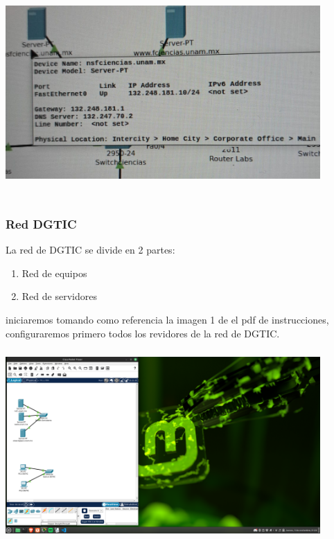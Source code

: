 \documentclass[14pt]{book}
\begin{document}
\includegraphics[width=12cm, height=8cm]{images/dns c5enc5as.jpeg}\\


{\color{red} \subsubsection*{\textbf{Red DGTIC}}}
\vspace{1em}

La red de DGTIC se divide en 2 partes:\\
\begin{enumerate}
  \item Red de equipos
  \item Red de servidores
\end{enumerate}

iniciaremos tomando como referencia la imagen 1 de el pdf de instrucciones, configuraremos primero todos los revidores de la red de DGTIC.\\

\includegraphics[width=12cm, height=8cm]{images/redesdgtic.png}\\
\end{document}
